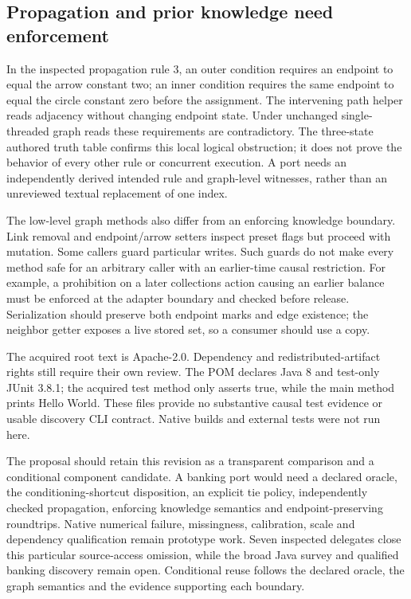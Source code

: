 \subsection{Propagation and prior knowledge need enforcement}
In the inspected propagation rule 3, an outer condition requires an endpoint
to equal the arrow constant two; an inner condition requires the same endpoint
to equal the circle constant zero before the assignment. The intervening path
helper reads adjacency without changing endpoint state. Under unchanged
single-threaded graph reads these requirements are contradictory. The
three-state authored truth table confirms this local logical obstruction;
it does not prove the behavior of every other rule or concurrent execution.
A port needs an independently derived intended rule and graph-level witnesses,
rather than an unreviewed textual replacement of one index.
\citep{exec28_fj_java,exec28_fj_reference}

The low-level graph methods also differ from an enforcing knowledge boundary.
Link removal and endpoint/arrow setters inspect preset flags but proceed with
mutation. Some callers guard particular writes. Such guards do not make every
method safe for an arbitrary caller with an earlier-time causal restriction.
For example, a prohibition on a later collections action causing an earlier
balance must be enforced at the adapter boundary and checked before release.
Serialization should preserve both endpoint marks and edge existence; the
neighbor getter exposes a live stored set, so a consumer should use a copy.
\citep{exec28_fj_java}

The acquired root text is Apache-2.0. Dependency and redistributed-artifact
rights still require their own review. The POM declares Java 8 and test-only
JUnit 3.8.1; the acquired test method only asserts true, while the main method
prints Hello World. These files provide no substantive causal test evidence
or usable discovery CLI contract. Native builds and external tests were not
run here.~\citep{exec28_fj_java}

The proposal should retain this revision as a transparent comparison and a
conditional component candidate. A banking port would need a declared oracle,
the conditioning-shortcut disposition, an explicit tie policy, independently
checked propagation, enforcing knowledge semantics and endpoint-preserving
roundtrips. Native numerical failure, missingness, calibration, scale and
dependency qualification remain prototype work. Seven inspected delegates
close this particular source-access omission, while the broad Java survey and
qualified banking discovery remain open. Conditional reuse follows the
declared oracle, the graph semantics and the evidence supporting each boundary.

